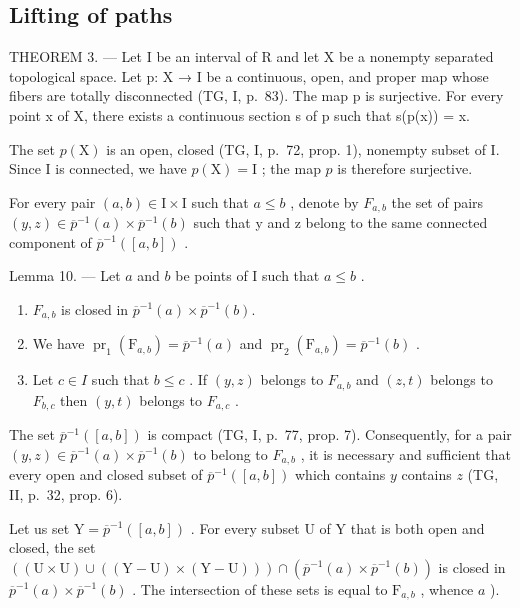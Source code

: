 \subsection{Lifting of paths}

THEOREM 3. --- Let I be an interval of R and let X be a nonempty separated topological space. Let p: X → I be a continuous, open, and proper map whose fibers are totally disconnected (TG, I, p.~83). The map p is surjective. For every point x of X, there exists a continuous section s of p such that s(p(x)) = x.

The set \(p(\mathrm{X})\) is an open, closed (TG, I, p.~72, prop. 1), nonempty subset of I. Since I is connected, we have \(p(\mathrm{X}) = \mathrm{I}\) ; the map \(p\) is therefore surjective.

For every pair \((a,b)\in\mathrm{I}\times\mathrm{I}\) such that \(a\leqslant b\) , denote by \(F_{a,b}\) the set of pairs \((y,z)\in\overline{p}^{-1}(a)\times\overline{p}^{-1}(b)\) such that y and z belong to the same connected component of \(\overline{p}^{-1}([a,b])\) .

Lemma 10. --- Let \(a\) and \(b\) be points of I such that \(a \leqslant b\) .

\begin{enumerate}
\def\labelenumi{\alph{enumi})}
\item
  \(F_{a,b}\) is closed in \(\overline{p}^{-1}(a)\times\overline{p}^{-1}(b)\).
\item
  We have \(\operatorname{pr}_1(\mathrm{F}_{a,b}) = \overline{p}^{-1}(a)\) and \(\operatorname{pr}_2(\mathrm{F}_{a,b}) = \overline{p}^{-1}(b)\) .
\item
  Let \(c \in I\) such that \(b \leqslant c\) . If \((y,z)\) belongs to \(F_{a,b}\) and \((z,t)\) belongs to \(F_{b,c}\) then \((y,t)\) belongs to \(F_{a,c}\) .
\end{enumerate}

The set \(\overline{p}^{-1}([a,b])\) is compact (TG, I, p.~77, prop. 7). Consequently, for a pair \((y,z)\in\overline{p}^{-1}(a)\times\overline{p}^{-1}(b)\) to belong to \(F_{a,b}\) , it is necessary and sufficient that every open and closed subset of \(\overline{p}^{-1}([a,b])\) which contains \(y\) contains \(z\) (TG, II, p.~32, prop. 6).

Let us set \(\mathrm{Y} = \overline{p}^{-1}([a,b])\) . For every subset U of Y that is both open and closed, the set \(((\mathrm{U} \times \mathrm{U}) \cup ((\mathrm{Y} - \mathrm{U}) \times (\mathrm{Y} - \mathrm{U}))) \cap (\overline{p}^{-1}(a) \times \overline{p}^{-1}(b))\) is closed in \(\overline{p}^{-1}(a) \times \overline{p}^{-1}(b)\) . The intersection of these sets is equal to \(\mathrm{F}_{a,b}\) , whence \(a\) ).

